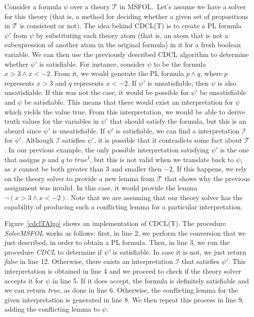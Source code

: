 Consider a formula $\psi$ over a theory $\mathcal{T}$ in MSFOL.\ Let's assume we have a solver for this theory (that is, a method for deciding whether a given set of propositions in $\mathcal{T}$ is consistent or not). The idea behind CDCL(T) is to create a PL formula $\psi'$ from $\psi$ by substituting each theory atom (that is, an atom that is not a subexpression of another atom in the original formula) in it for a fresh boolean variable. We can then use the previously described CDCL algorithm to determine whether $\psi'$ is satisfiable. For instance, consider $\psi$ to be the formula $x > 3 \wedge x < -2$. From it, we would generate the PL formula $p \wedge q$, where $p$ represents $x > 3$ and $q$ represents $x < -2$. If $\psi'$ is unsatisfiable, then $\psi$ is also unsatisfiable. If this was not the case, it would be possible for $\psi'$ be unsatisfiable and $\psi$ be satisfiable. This means that there would exist an interpretation for $\psi$ which yields the value true. From this interpretation, we would be able to derive truth values for the variables in $\psi'$ that should satisfy the formula, but this is an absurd since $\psi'$ is unsatisfiable.
If $\psi'$ is satisfiable, we can find a interpretation $\mathcal{I}$ for $\psi'$. Although $\mathcal{I}$ satisfies $\psi'$, it is possible that it contradicts some fact about $\mathcal{T}$. In our previous example,
the only possible interpretation satisfying $\psi'$ is the one that assigns $p$ and $q$ to $true^{I}$, but this is not valid when we translate back to $\psi$, as $x$ cannot be both greater than $3$ and smaller then $-2$.
 If this happens, we rely on the theory solver to provide a new lemma from $\mathcal{T}$ that shows why the previous assignment was invalid. In this case, it would provide the lemma $\neg (x > 3 \wedge x < -2)$. Note that we are assuming that our theory solver has the capability of producing such a conflicting lemma for a particular interpretation.


Figure~\ref{cdclTAlgo} shows an implementation of CDCL(T). The procedure \textit{SolveMSFOL} works as follows: first, in line 2, we perform the conversion that we just described, in order to obtain a PL formula. Then, in line 3, we run the procedure \textit{CDCL} to determine if $\psi'$ is satisfiable. In case it is not, we just return \textit{false} in line 12. Otherwise, there exists an interpretation $\mathcal{I}$ that satisfies $\psi'$. This interpretation is obtained in line 4 and we proceed to check if the theory solver accepts it for $\psi$ in line 5. If it does accept, the formula is definitely satisfiable and we can return \textit{true}, as done in line 6. Otherwise, the conflicting lemma for the given interpretation is generated in line 8. We then repeat this process in line 9, adding the conflicting lemma to $\psi$.

